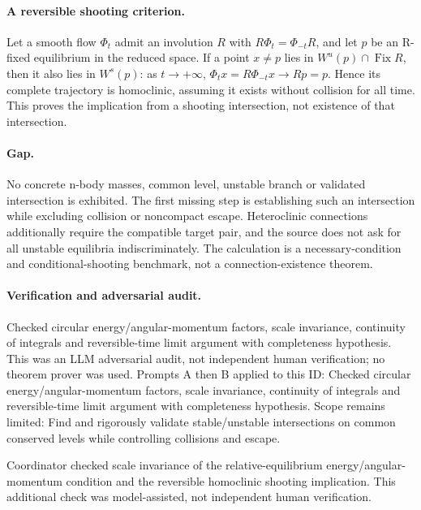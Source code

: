 \documentclass[11pt]{article}
\begin{document}
\paragraph{A reversible shooting criterion.}Let a smooth flow \(\Phi_t\) admit an involution \(R\) with \(R\Phi_t=\Phi_{-t}R\), and let \(p\) be an R-fixed equilibrium in the reduced space. If a point \(x\ne p\) lies in \(W^u(p)\cap\operatorname{Fix}R\), then it also lies in \(W^s(p)\): as \(t\to+\infty\), \(\Phi_t x=R\Phi_{-t}x\to Rp=p\). Hence its complete trajectory is homoclinic, assuming it exists without collision for all time. This proves the implication from a shooting intersection, not existence of that intersection.
\paragraph{Gap.}No concrete n-body masses, common level, unstable branch or validated intersection is exhibited. The first missing step is establishing such an intersection while excluding collision or noncompact escape. Heteroclinic connections additionally require the compatible target pair, and the source does not ask for all unstable equilibria indiscriminately. The calculation is a necessary-condition and conditional-shooting benchmark, not a connection-existence theorem.

\paragraph{Verification and adversarial audit.}
Checked circular energy/angular-momentum factors, scale invariance, continuity of integrals and reversible-time limit argument with completeness hypothesis. This was an LLM adversarial audit, not independent human verification; no theorem prover was used. Prompts A then B applied to this ID: Checked circular energy/angular-momentum factors, scale invariance, continuity of integrals and reversible-time limit argument with completeness hypothesis. Scope remains limited: Find and rigorously validate stable/unstable intersections on common conserved levels while controlling collisions and escape.

Coordinator checked scale invariance of the relative-equilibrium energy/angular-momentum condition and the reversible homoclinic shooting implication. This additional check was model-assisted, not independent human verification.
\end{document}
